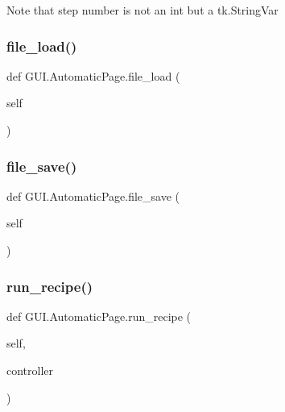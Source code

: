 \begin{DoxyVerb}Note that step number is not an int but a tk.StringVar
\end{DoxyVerb}
 \mbox{\label{class_g_u_i_1_1_automatic_page_aa442c41a4f0959a30bf296a4384a7a0f}} 
\subsubsection{\texorpdfstring{file\_load()}{file\_load()}}
{\footnotesize\ttfamily def G\+U\+I.\+Automatic\+Page.\+file\+\_\+load (\begin{DoxyParamCaption}\item[{}]{self }\end{DoxyParamCaption})}

\mbox{\label{class_g_u_i_1_1_automatic_page_a55efb4084de63f91f76fc7d9f8e85e4f}} 
\subsubsection{\texorpdfstring{file\_save()}{file\_save()}}
{\footnotesize\ttfamily def G\+U\+I.\+Automatic\+Page.\+file\+\_\+save (\begin{DoxyParamCaption}\item[{}]{self }\end{DoxyParamCaption})}

\mbox{\label{class_g_u_i_1_1_automatic_page_a583b326d8206caf80794251790de6ded}} 
\subsubsection{\texorpdfstring{run\_recipe()}{run\_recipe()}}
{\footnotesize\ttfamily def G\+U\+I.\+Automatic\+Page.\+run\+\_\+recipe (\begin{DoxyParamCaption}\item[{}]{self,  }\item[{}]{controller }\end{DoxyParamCaption})}

